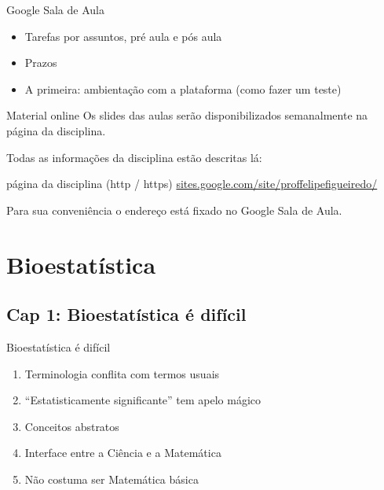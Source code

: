 \documentclass{beamer}
\begin{document}
\begin{frame}{\scriptsize Google Sala de Aula}
  \begin{itemize}
    \footnotesize
  \item Tarefas por assuntos, pré aula e pós aula
    \medskip
  \item Prazos
    \medskip
  \item A primeira: ambientação com a plataforma (como fazer um teste)
  \end{itemize}
\end{frame}

\begin{frame}{\scriptsize Material online}
  \footnotesize
  Os slides das aulas serão disponibilizados semanalmente na página da disciplina.

  \bigskip
  Todas as informações da disciplina estão descritas lá:
  \begin{block}{página da disciplina (http / https)}
    \footnotesize
    \url{sites.google.com/site/proffelipefigueiredo/}
  \end{block}

  \bigskip
  Para sua conveniência o endereço está fixado no Google Sala de Aula.
\end{frame}

\section{Bioestatística}

\subsection{Cap 1: Bioestatística é difícil}

\begin{frame}{\scriptsize Bioestatística é difícil}
  \begin{enumerate}
    \footnotesize
  \item Terminologia conflita com termos usuais
  \item ``Estatisticamente significante'' tem apelo mágico
  \item Conceitos abstratos
  \item Interface entre a Ciência e a Matemática
  \item Não costuma ser Matemática básica
  \end{enumerate}
\end{frame}
\end{document}
